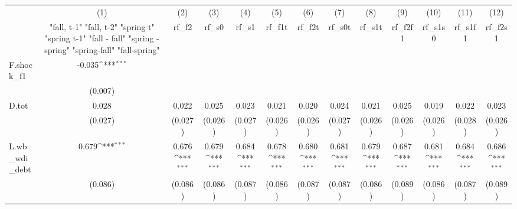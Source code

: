 {
\def\sym#1{\ifmmode^{#1}\else\(^{#1}\)\fi}
\begin{tabular}{l*{12}{c}}
\toprule
            &\multicolumn{1}{c}{(1)}&\multicolumn{1}{c}{(2)}&\multicolumn{1}{c}{(3)}&\multicolumn{1}{c}{(4)}&\multicolumn{1}{c}{(5)}&\multicolumn{1}{c}{(6)}&\multicolumn{1}{c}{(7)}&\multicolumn{1}{c}{(8)}&\multicolumn{1}{c}{(9)}&\multicolumn{1}{c}{(10)}&\multicolumn{1}{c}{(11)}&\multicolumn{1}{c}{(12)}\\
            &\multicolumn{1}{c}{  "fall, t-1" "fall, t-2" "spring t" "spring t-1"  "fall - fall" "spring - spring" "spring-fall" "fall-spring" }&\multicolumn{1}{c}{rf\_f2}&\multicolumn{1}{c}{rf\_s0}&\multicolumn{1}{c}{rf\_s1}&\multicolumn{1}{c}{rf\_f1t}&\multicolumn{1}{c}{rf\_f2t}&\multicolumn{1}{c}{rf\_s0t}&\multicolumn{1}{c}{rf\_s1t}&\multicolumn{1}{c}{rf\_f2f1}&\multicolumn{1}{c}{rf\_s1s0}&\multicolumn{1}{c}{rf\_s1f1}&\multicolumn{1}{c}{rf\_f2s1}\\
\midrule
F.shock\_f1  &      -0.035\sym{***}&                     &                     &                     &                     &                     &                     &                     &                     &                     &                     &                     \\
            &     (0.007)         &                     &                     &                     &                     &                     &                     &                     &                     &                     &                     &                     \\
\addlinespace
D.tot       &       0.028         &       0.022         &       0.025         &       0.023         &       0.021         &       0.020         &       0.024         &       0.021         &       0.025         &       0.019         &       0.022         &       0.023         \\
            &     (0.027)         &     (0.027)         &     (0.026)         &     (0.027)         &     (0.026)         &     (0.026)         &     (0.027)         &     (0.026)         &     (0.026)         &     (0.026)         &     (0.028)         &     (0.026)         \\
\addlinespace
L.wb\_wdi\_debt&       0.679\sym{***}&       0.676\sym{***}&       0.679\sym{***}&       0.684\sym{***}&       0.678\sym{***}&       0.680\sym{***}&       0.681\sym{***}&       0.679\sym{***}&       0.687\sym{***}&       0.681\sym{***}&       0.684\sym{***}&       0.686\sym{***}\\
            &     (0.086)         &     (0.086)         &     (0.086)         &     (0.087)         &     (0.086)         &     (0.087)         &     (0.087)         &     (0.086)         &     (0.089)         &     (0.086)         &     (0.087)         &     (0.089)         \\

\end{tabular}}
